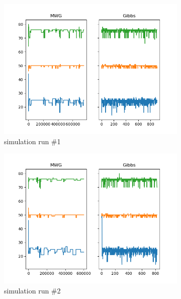 \begin{figure}[H]
    \centering
    \begin{subfigure}{.3\textwidth}
    	\centering
        \includegraphics[width=\linewidth]{../../plots/Trace_M4_N100_NMCMC3_seed0_diffind2.png}
        \caption{simulation run \#1}
    \end{subfigure}
    \begin{subfigure}{.3\textwidth}
        \centering
    	\includegraphics[width=\linewidth]{../../plots/Trace_M4_N100_NMCMC3_seed1_diffind2.png}
    	\caption{simulation run \#2}
	\end{subfigure}
	\begin{subfigure}{.3\textwidth}
	    \centering

\end{subfigure}
\end{figure}
